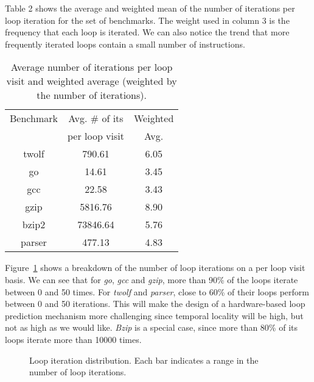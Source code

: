 \documentclass[times,10pt,twocolumn]{article}
\newcommand{\vs}{\vspace}
\begin{document}

Table 2 shows the average and weighted mean of the number of iterations
per loop iteration for 
the set of benchmarks. The weight used in column 3 is the frequency that each
loop is iterated.  We can also notice the trend
that more frequently iterated loops contain a small number of instructions.

\begin{table}[htb]
\caption{Average number of iterations per loop visit and weighted average
(weighted by the number of iterations).}
\begin{center}
{\footnotesize
\begin{tabular}{|c|c|c|}
\hline 
Benchmark & Avg. \# of its &  Weighted \\ 
          & per loop visit & Avg. \\ \hline \hline 
twolf & 790.61 & 6.05 \\ \hline 
go & 14.61 & 3.45 \\ \hline 
gcc & 22.58 & 3.43 \\ \hline 
gzip & 5816.76 & 8.90 \\ \hline 
bzip2 & 73846.64 & 5.76 \\ \hline 
parser & 477.13 & 4.83 \\ \hline
\end{tabular}
}
\end{center}
\end{table}


Figure~\ref{fig:fig5} shows a breakdown of the number of loop iterations
on a per loop visit basis.
We can see that for {\it go}, {\it gcc} and {\it gzip}, more than 90\% 
of the loops iterate between 0 and 50 times. For {\it twolf} 
and {\it parser}, close to 60\% of their loops perform between 0 and 
50 iterations. This will make the design of a hardware-based loop prediction 
mechanism more challenging since temporal locality will be high, but not as
high as we would like.  {\it Bzip} is a special case, since 
more than 80\% of its loops iterate more than 10000 times. 

\begin{figure}
\vspace{0.2 in}
\setlength{\epsfxsize}{10cm}%
\centerline{}
\caption{Loop iteration distribution. Each bar
indicates a range in the number of loop iterations.}
\label{fig:fig5}
\end{figure}
\end{document}
